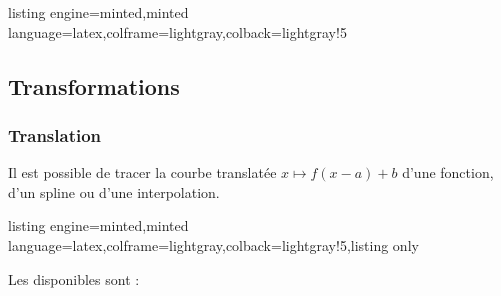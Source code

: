 \documentclass[11pt,a4paper]{ltxdoc}
\begin{document}
\begin{tcblisting}{listing engine=minted,minted language=latex,colframe=lightgray,colback=lightgray!5}
\begin{GraphiqueTikz}[]
\end{GraphiqueTikz}
\begin{GraphiqueTikz}[]
\end{GraphiqueTikz}
\end{tcblisting}

\pagebreak

\subsection{Transformations}

\subsubsection{Translation}\label{transform}

Il est possible de tracer la courbe translatée $x \mapsto f(x-a)+b$ d'une fonction, d'un spline ou d'une interpolation.

\begin{tcblisting}{listing engine=minted,minted language=latex,colframe=lightgray,colback=lightgray!5,listing only}
\end{tcblisting}

Les  disponibles sont :
\end{document}
